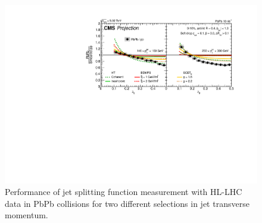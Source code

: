 \begin{figure}[!ht]
\begin{center}
\includegraphics[width=.95\textwidth]{figures/cms/ZGMoneyPlot.pdf}
\caption{Performance of jet splitting function measurement with HL-LHC data in PbPb collisions for two different selections in jet transverse momentum. \cite{CMS-FTR-17-002:2017dec}}
\label{fig:ZG}
\end{center}
\end{figure}
%
